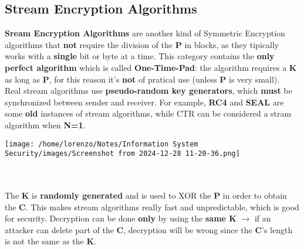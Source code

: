 \subsection{Stream Encryption Algorithms}
\begin{minipage}{0.6\textwidth}
\textbf{Sream Encryption Algorithms} are another kind of Symmetric Encryption algorithms that \textbf{not} require the division of the \textbf{P} in blocks, as they tipically works with a \textbf{single} bit or byte at a time. This category contains the \textbf{only perfect algorithm} which is called \textbf{One-Time-Pad}: the algorithm requires a \textbf{K} as long as \textbf{P}, for this reason it's \textbf{not} of pratical use (unless \textbf{P} is very small).\\Real stream algorithms use \textbf{pseudo-random key generators}, which \textbf{must} be synchronized between sender and receiver. For example, \textbf{RC4} and \textbf{SEAL} are some \textbf{old}
instances of stream algorithms, while CTR can be considered a stram algorithm when \textbf{N=1}.
\end{minipage} 
\hspace{0.3cm}
\begin{minipage}{0.4\textwidth}
    \centering
    \texttt{[image: /home/lorenzo/Notes/Information System Security/images/Screenshot from 2024-12-28 11-20-36.png]}
\end{minipage}
\noindent
\\
\\
The \textbf{K} is \textbf{randomly generated} and is used to XOR the \textbf{P} in order to obtain the \textbf{C}. This
makes stream algorithms really fast and unpredictable, which is good for security.
Decryption can be done \textbf{only} by using the \textbf{same K} \(\rightarrow \) if an attacker can delete part of the
\textbf{C}, decryption will be wrong since the \textbf{C}’s length is not the same as the \textbf{K}.
\noindent   
